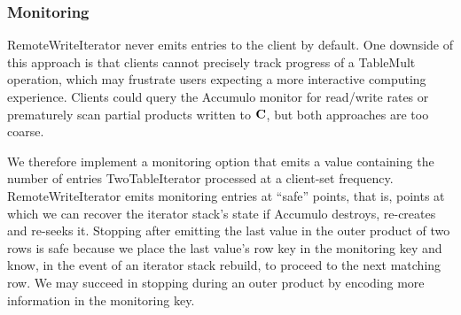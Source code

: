 \subsubsection{Monitoring}
RemoteWriteIterator never emits entries to the client by default. 
One downside of this approach is that clients cannot precisely track progress of a TableMult operation,
which may frustrate users expecting a more interactive computing experience.
Clients could query the Accumulo monitor for read/write rates 
or prematurely scan partial products written to $\mathbf{C}$, but both approaches are too coarse.

We therefore implement a monitoring option that emits a value
containing the number of entries TwoTableIterator processed
at a client-set frequency.
RemoteWriteIterator emits monitoring entries at ``safe'' points, that is,
points at which we can recover the iterator stack's state 
if Accumulo destroys, re-creates and re-seeks it.
Stopping after emitting the last value in the outer product of two rows is safe 
because we place the last value's row key in the monitoring key and know, 
in the event of an iterator stack rebuild, to proceed to the next matching row.
We may succeed in stopping during an outer product 
by encoding more information in the monitoring key.




 



